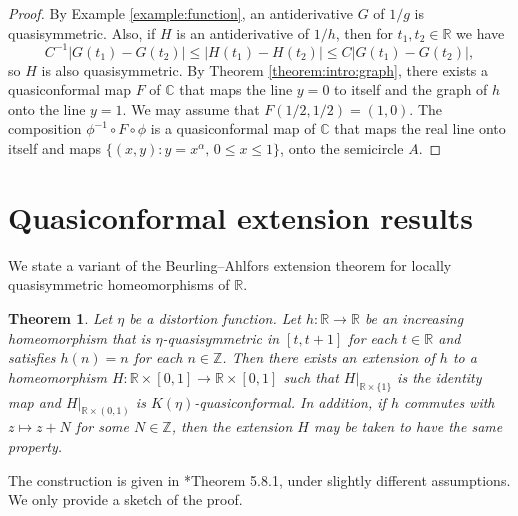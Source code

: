\documentclass[letterpaper]{amsart}
\theoremstyle{plain}
\newtheorem{theorem}{Theorem}
\theoremstyle{definition}
\theoremstyle{remark}
\numberwithin{equation}{section}
\numberwithin{theorem}{section}
\newcommand{\R}{\mathbb R}
\newcommand{\C}{\mathbb C}
\newcommand{\Z}{\mathbb Z}
\begin{document}
\begin{proof}
By Example \ref{example:function}, an antiderivative $G$ of $1/g$ is quasisymmetric. Also, if $H$ is an antiderivative of $1/h$, then for $t_1,t_2\in \R$ we have
$$ C^{-1} |G(t_1)-G(t_2)|\leq |H(t_1)-H(t_2)|\leq C |G(t_1)-G(t_2)|,$$
so $H$ is also quasisymmetric. By Theorem \ref{theorem:intro:graph}, there exists a quasiconformal map $F$ of $\C$ that maps the line $y=0$ to itself and the graph of $h$ onto the line $y=1$. We may assume that $F(1/2,1/2)=(1,0)$. The composition $\phi^{-1}\circ F\circ \phi$ is a quasiconformal map of $\C$ that maps the real line onto itself and maps $\{(x,y):y=x^\alpha,\, 0\leq x\leq 1\}$, onto the semicircle $A$.  
\end{proof}

\section{Quasiconformal extension results}\label{section:extension_general}

We state a variant of the Beurling--Ahlfors extension theorem  for locally quasisymmetric homeomorphisms of $\R$. 

\begin{theorem}\label{theorem:qc_extension}
Let $\eta$ be a distortion function. Let $h\colon \R\to \R$ be an increasing homeomorphism that is $\eta$-quasi\-symmetric in $[t,t+1]$ for each $t\in \R$ and  satisfies $h(n)=n$ for each $n\in \Z$. Then there exists an extension of $h$ to a homeomorphism $H\colon \R\times [0,1]\to \R\times [0,1]$ such that $H|_{\R\times \{1\}}$ is the identity map and $H|_{\R\times (0,1)}$ is $K(\eta)$-quasiconformal.  In addition, if $h$ commutes with $z\mapsto z+N$  for some $N\in \Z$, then the extension $H$ may be taken to have the same property.
\end{theorem}
The construction is given in \cite{AstalaIwaniecMartin:quasiconformal}*{Theorem 5.8.1}, under slightly different assumptions. We only provide a sketch of the proof. 
\end{document}
